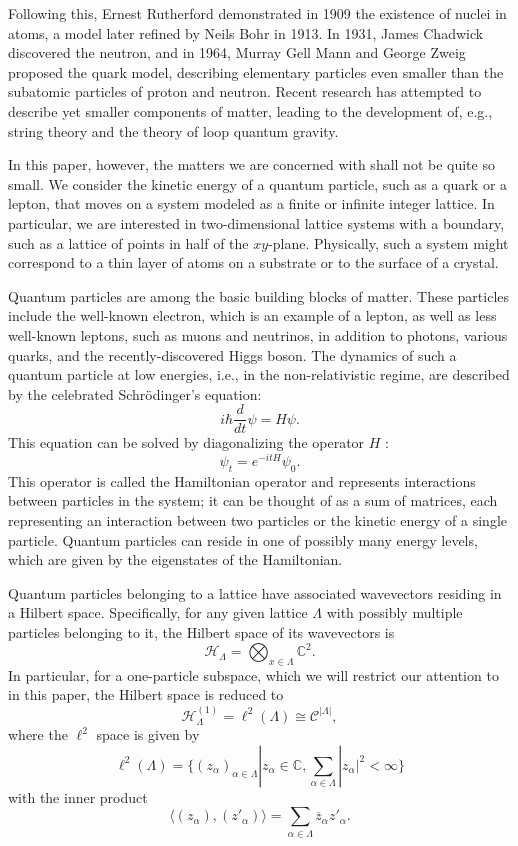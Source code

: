 \documentclass{article}
\numberwithin{equation}{section}
\numberwithin{theorem}{section}
\numberwithin{proposition}{section}
\numberwithin{lemma}{section}
\numberwithin{corollary}{section}
\numberwithin{definition}{section}
\begin{document}
Following this, Ernest Rutherford demonstrated in 1909 the existence of nuclei in atoms, a model later refined by Neils Bohr in 1913. In 1931, James Chadwick discovered the neutron, and in 1964, Murray Gell Mann and George Zweig proposed the quark model, describing elementary particles even smaller than the subatomic particles of proton and neutron. Recent research has attempted to describe yet smaller components of matter, leading to the development of, e.g., string theory and the theory of loop quantum gravity.

In this paper, however, the matters we are concerned with shall not be quite so small. We consider the kinetic energy of a quantum particle, such as a quark or a lepton, that moves on a system modeled as a finite or infinite integer lattice. In particular, we are interested in two-dimensional lattice systems with a boundary, such as a lattice of points in half of the $xy$-plane. Physically, such a system might correspond to a thin layer of atoms on a substrate or to the surface of a crystal. 

Quantum particles are among the basic building blocks of matter. These particles include the well-known electron, which is an example of a lepton, as well as less well-known leptons, such as muons and neutrinos, in addition to photons, various quarks, and the recently-discovered Higgs boson. The dynamics of such a quantum particle at low energies, i.e., in the non-relativistic regime, are described by the celebrated Schr\"{o}dinger's equation:
	 \[
	 i \hbar \frac{d}{dt} \psi = H \psi.
	 \]
This equation can be solved by diagonalizing the operator $H$ \cite{griffiths}:
	 \[
	 \psi_t = e^{-itH} \psi_0.
	 \]	
This operator is called the Hamiltonian operator and represents interactions between particles in the system; it can be thought of as a sum of matrices, each representing an interaction between two particles or the kinetic energy of a single particle. Quantum particles can reside in one of possibly many energy levels, which are given by the eigenstates of the Hamiltonian.

Quantum particles belonging to a lattice have associated wavevectors residing in a Hilbert space. Specifically, for any given lattice $\Lambda$ with possibly multiple particles belonging to it, the Hilbert space of its wavevectors is
	\[
	\mathcal{H}_\Lambda = \bigotimes_{x \in \Lambda} \mathbb{C}^2.
	\]
In particular, for a one-particle subspace, which we will restrict our attention to in this paper, the Hilbert space is reduced to
	\[
	\mathcal{H}_\Lambda^{(1)} = \ell^2(\Lambda) \cong \mathcal{C}^{|\Lambda|},
	\]
where the $\ell^2$ space is given by 
	\[
	\ell^2(\Lambda) = \{(z_\alpha)_{\alpha \in \Lambda}| z_\alpha \in \mathbb{C}, \sum_{\alpha \in \Lambda} |z_\alpha|^2 < \infty\}
	\]
with the inner product
	\[
	\langle (z_\alpha), (z'_\alpha) \rangle = \sum_{\alpha \in \Lambda} \overline{z}_\alpha  z'_\alpha .
	\]
\end{document}
